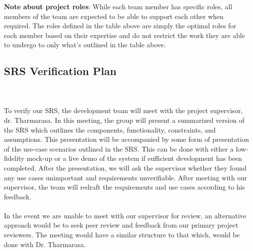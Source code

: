 \documentclass[12pt, titlepage]{article}
\begin{document}
\textbf{Note about project roles}: While each team member has specific roles, all members of the team are expected to be able to support each other when required. The roles defined in the table above are simply the optimal roles for each member based on their expertise and do not restrict the work they are able to undergo to only what's outlined in the table above.

\subsection{SRS Verification Plan}
\label{section:SRSVerificationPlan}


\\
\\

To verify our SRS, the development team will meet with the project supervisor, dr. Tharmarasa. In this meeting, the group will present a summarized version of the SRS which outlines the components, functionality, constraints, and assumptions. This presentation will be accompanied by some form of presentation of the use-case scenarios outlined in the SRS. This can be done with either a low-fidelity mock-up or a live demo of the system if sufficient development has been completed. After the presentation, we will ask the supervisor whether they found any use cases unimportant and requirements unverifiable. After meeting with our supervisor, the team will redraft the requirements and use cases according to his feedback. \\\\
In the event we are unable to meet with our supervisor for review, an alternative approach would be to seek peer review and feedback from our primary project reviewers. The meeting would have a similar structure to that which, would be done with Dr. Tharmarasa. \\
\end{document}
